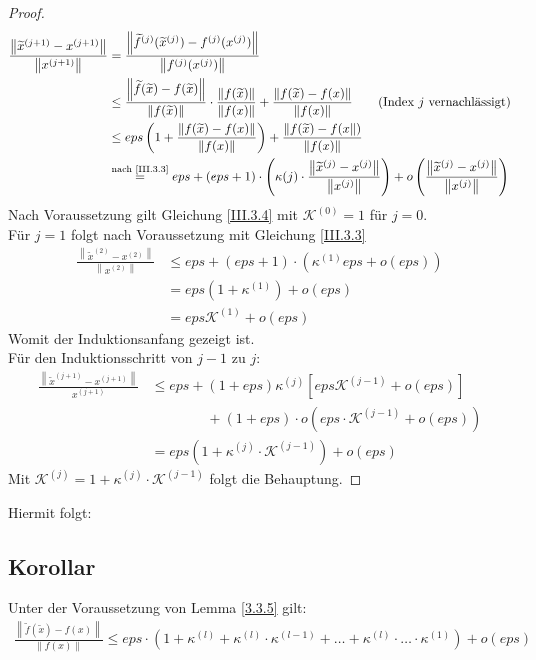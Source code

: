 \documentclass[ngerman,fontsize=11pt, paper=a4, parskip=half, titlepage=true, toc=bib]{scrbook}
\newcommand{\K}{\mathcal{K}}
\newcommand{\nn}[1]{\left\| #1 \right\|}
\begin{document}
\begin{proof}
\begin{align*}
	\frac{\nn{\widetilde{x}^{(j+1)}-x^{(j+1)}}}{\nn{x^{(j+1)}}}
				&= \frac{\nn{\widetilde{f}^{(j)}(\widetilde{x}^{(j)})-f^{(j)}(x^{(j)})}}
				{\nn{f^{(j)}(x^{(j)})}} \\
				&\leq \frac{\nn{\widetilde{f}(\widetilde{x})-f(\widetilde{x})}}{\nn{f(\widetilde{x})}}
						\cdot \frac{\nn{f(\widetilde{x})}}{\nn{f(x)}}
						+ \frac{\nn{f(\widetilde{x})-f({x})}}{\nn{f(x)}} 
						\quad\quad \text{(Index $j$ vernachlässigt)}\\
				&\leq eps \left( 1+ \frac{\nn{f(\widetilde{x})-f({x})}}{\nn{f(x)}}\right)
						+ \frac{\nn{f(\widetilde{x})-f({x}})}{\nn{f(x)}}\\
				&\overset{\text{nach \ref{III.3.3}}}{=} eps + (eps+1) \cdot 						\left(\kappa{(j)}\cdot \frac{\nn{\widetilde{x}^{(j)}-x^{(j)}}}{\nn{x^{(j)}}}\right)
						+ o\left( \frac{\nn{\widetilde{x}^{(j)}-x^{(j)}}}{\nn{x^{(j)}}}\right)
\end{align*}
Nach Voraussetzung gilt Gleichung \eqref{III.3.4}  mit $\K^{(0)}=1$ für $j=0$. \\
Für $j=1$ folgt nach Voraussetzung mit Gleichung \eqref{III.3.3}
\begin{align*}
	\frac{\nn{\widetilde{x}^{(2)}-x^{(2)}}}{\nn{x^{(2)}}}
	 & \leq eps +(eps+1) \cdot \left( \kappa^{(1)}eps+ o(eps)\right) \\
	 &= eps(1+\kappa^{(1)}) + o(eps) \\
	 &= eps\K^{(1)} + o(eps)
\end{align*}
Womit der Induktionsanfang gezeigt ist. \\
Für den Induktionsschritt von $j-1$ zu $j$:
\begin{align*}
	\frac{\nn{\widetilde{x}^{(j+1)}-x^{(j+1)}}}{x^{(j+1)}}
		& \leq eps + (1+eps)\kappa^{(j)} \left[ eps \K^{(j-1)}+ o(eps) \right] \\
		&\phantom{\leq eps+} + (1+eps) \cdot o\left( eps\cdot \K^{(j-1)} +o(eps)\right) \\
		&= eps\left(1+\kappa^{(j)}\cdot \K^{(j-1)}\right)+ o(eps)
\end{align*}
Mit $\K^{(j)} = 1+ \kappa^{(j)}\cdot \K^{(j-1)}$ folgt die Behauptung.
\end{proof}

Hiermit folgt:

\subsection{Korollar}\label{3.3.6}
Unter der Voraussetzung von Lemma \ref{3.3.5} gilt:
\begin{gather}
	\frac{\nn{\widetilde{f}(\widetilde{x})-f(x)}}{\nn{f(x)}} \leq 
		eps\cdot \left( 1+\kappa^{(l)}+ \kappa^{(l)}\cdot \kappa^{(l-1)}+ \dotsc
			+ \kappa^{(l)}\cdot \dotsc \cdot \kappa^{(1)}\right) + o(eps) 
			\label{III.3.5}
\end{gather}
\end{document}
